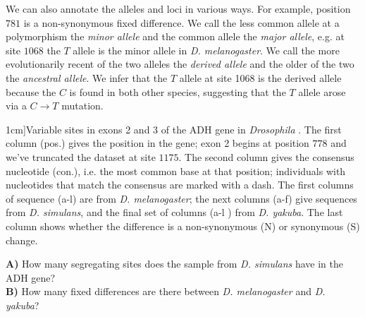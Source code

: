 We can also annotate the alleles and loci in various ways. For example, position
$781$ is a non-synonymous fixed difference. We call the less common
allele at a polymorphism the  \emph{minor allele} and the common
allele the \emph{major allele}, e.g. at site $1068$ the $T$ allele is the
minor allele in {\it D. melanogaster}. We call the more evolutionarily
recent of the two alleles the \emph{derived allele} and the older of
the two the \emph{ancestral allele}. We infer that the $T$ allele at site 1068 is
the derived allele because the $C$ is found in both other species,
suggesting that the $T$ allele arose via a $C \rightarrow T$ mutation.


\begin{table*}
  \begin{center}
  \small
\setlength{\tabcolsep}{.55 \tabcolsep}   %
\end{center}
\caption[][1cm]{Variable sites in exons 2 and 3 of the ADH gene in {\it Drosophila} \citet{mcdonald:91}.
The first column (pos.) gives the position in the gene; exon 2 begins at
position $778$ and we've truncated the dataset at site $1175$.
The second column gives the consensus nucleotide (con.), i.e. the most
common base at that position; individuals with nucleotides that match
the consensus are marked with a dash.  The first columns of sequence
(a-l) are from {\it D. melanogaster};
    the next columns (a-f) give sequences from \textit{D. simulans}, and the final
 set of columns (a-l ) from {\it D. yakuba}. The last column shows
 whether the difference is a non-synonymous (N) or synonymous (S) change. }  %
  \label{Table:ADH}
\end{table*}

\begin{question}{}
{\bf A)} How many segregating sites does the sample from \textit{
  D. simulans} have in the ADH gene?\\
{\bf B)} How many fixed differences are there between \textit{D. melanogaster} and \textit{D. yakuba}?
\end{question}

